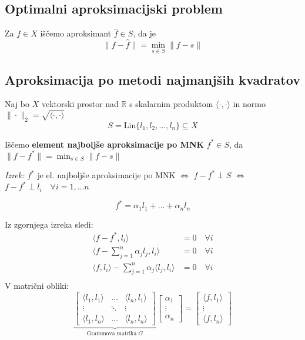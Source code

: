 \begin{multicols}{5}
\subsection*{Optimalni aproksimacijski problem}
Za $f \in X$ iščemo aproksimant $\hat{f} \in S$, da je
\[ \| f - \hat{f} \| = \min_{s \in S} \| f - s \| \]

\subsection*{Aproksimacija po metodi najmanjših kvadratov}
Naj bo $X$ vektorski prostor nad $\mathbb{R}$ s skalarnim produktom $\langle \cdot, \cdot \rangle$ in normo $\| \cdot \|_2 = \sqrt{\langle \cdot, \cdot \rangle}$ 
\[ S = \text{Lin}\{l_1, l_2, \dots, l_n\} \subseteq X \]

Iščemo \textbf{element najboljše aproksimacije po MNK} $f^* \in S$, da $\| f - f^* \| = \min_{s \in S} \| f - s \| $

\textit{Izrek:} $f^*$ je el. najboljše aproksimacije po MNK $\iff$ $f-f^* \perp S$ $\iff$
$f-f^* \perp l_i \quad \forall i = 1,\dots n$

\[ f^* = \alpha_1 l_1 + \dots + \alpha_n l_n\]

Iz zgornjega izreka sledi:
\begin{align*}
\langle f - f^*, l_i \rangle &= 0 \quad \forall i\\
\langle f - \sum_{j=1}^n \alpha_j l_j, l_i \rangle &= 0 \quad \forall i\\
\langle f, l_i\rangle - \sum_{j=1}^n \alpha_j \langle  l_j, l_i \rangle &= 0 \quad \forall i\\
\end{align*}
V matrični obliki:
\[
    \underbrace{\begin{bmatrix}
        \langle l_1, l_1 \rangle & \dots & \langle l_n, l_1 \rangle \\
        \vdots & \ddots & \vdots \\
        \langle l_1, l_n \rangle & \dots & \langle l_n, l_n \rangle
    \end{bmatrix}}_{\text{Grammova matrika $G$}}
    \begin{bmatrix}
        \alpha_1 \\
        \vdots \\
        \alpha_n
    \end{bmatrix}
    =
    \begin{bmatrix}
        \langle f, l_1 \rangle \\
        \vdots \\
        \langle f, l_n \rangle
    \end{bmatrix}
\]


\end{multicols}
